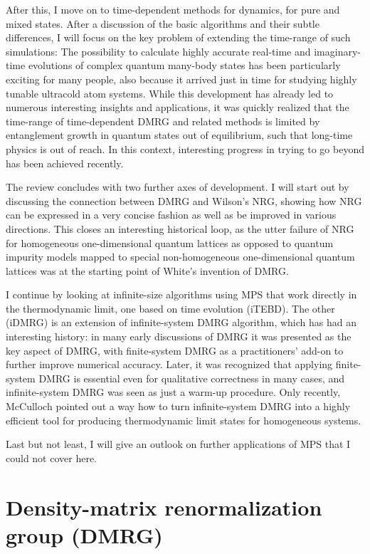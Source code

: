 \documentclass[a4paper,10pt,oneside,onecolumn,1p,times]{elsarticle}
\begin{document}
After this, I move on to time-dependent methods for dynamics, for pure and mixed states. After a discussion of the basic algorithms and their subtle differences, I will focus on the key problem of extending the time-range of such simulations: The possibility to calculate highly accurate real-time and imaginary-time evolutions of complex quantum many-body states has been particularly exciting for many people, also because it arrived just in time for studying highly tunable ultracold atom systems. While this development has already led to numerous interesting insights and applications, it was quickly realized that the time-range of  time-dependent DMRG and related methods is limited by entanglement growth in quantum states out of equilibrium, such that long-time physics is out of reach. In this context, interesting progress in trying to go beyond has been achieved recently.

The review concludes with two further axes of development. I will start out by discussing the connection between DMRG and Wilson's NRG, showing how NRG can be expressed in a very concise fashion as well as be improved in various directions. This closes an interesting historical loop, as the utter failure of NRG for homogeneous one-dimensional quantum lattices as opposed to quantum impurity models mapped to special non-homogeneous one-dimensional quantum lattices was at the starting point of White's invention of DMRG\cite{WhiteNoack92}.

I continue by looking at infinite-size algorithms using MPS that work directly in the thermodynamic limit, one based on time evolution (iTEBD)\cite{Vidal07}. The other (iDMRG)\cite{McCulloch08} is an extension of infinite-system DMRG algorithm, which has had an interesting history: in many early discussions of DMRG it was presented as the key aspect of DMRG, with finite-system DMRG as a practitioners' add-on to further improve numerical accuracy. Later, it was recognized that applying finite-system DMRG is essential even for qualitative correctness in many cases, and infinite-system DMRG was seen as just a warm-up procedure. Only recently, McCulloch\cite{McCulloch08} pointed out a way how to turn infinite-system DMRG into a highly efficient tool for producing thermodynamic limit states for homogeneous systems. 

Last but not least, I will give an outlook on further applications of MPS that I could not cover here.

\section{Density-matrix renormalization group (DMRG)}
\end{document}

